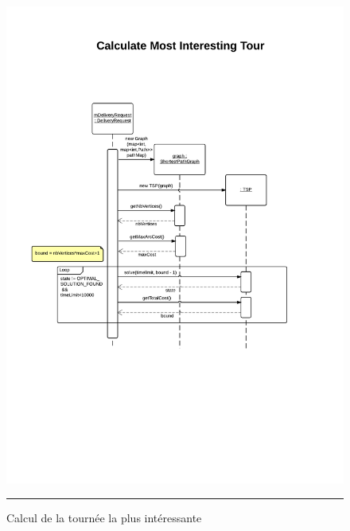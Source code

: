 \begin{figure}[H]
	\centering
		\includegraphics[width=\textwidth,height=\textheight,keepaspectratio]{Figures/calcul_tournee3}
		\rule{35em}{0.5pt}
	\caption[Calcul de la tournée la plus intéressante]{Calcul de la tournée la plus intéressante}
\end{figure}
\clearpage
